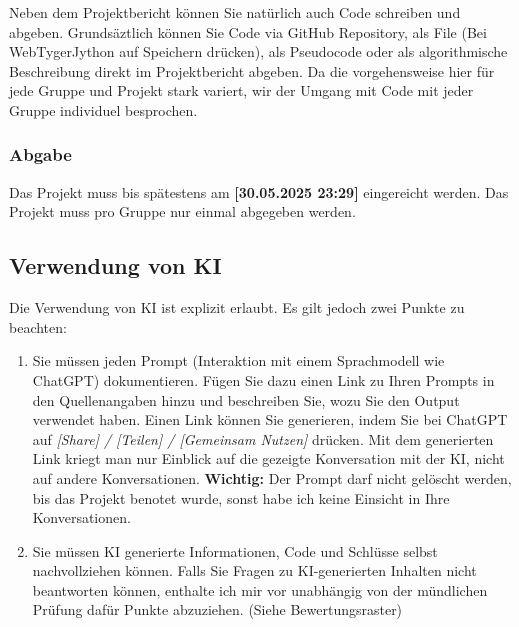 \documentclass[12pt, a4]{article}
\begin{document}
Neben dem Projektbericht können Sie natürlich auch Code schreiben und abgeben.
Grundsäztlich können Sie Code via GitHub Repository, als File (Bei WebTygerJython auf Speichern drücken), als Pseudocode oder als algorithmische Beschreibung direkt im Projektbericht abgeben.
Da die vorgehensweise hier für jede Gruppe und Projekt stark variert, wir der Umgang mit Code mit jeder Gruppe individuel besprochen.

\subsubsection*{Abgabe}
Das Projekt muss bis spätestens am \textbf{[30.05.2025 23:29]} eingereicht werden.
Das Projekt muss pro Gruppe nur einmal abgegeben werden.

\subsection*{Verwendung von KI}
Die Verwendung von KI ist explizit erlaubt. 
Es gilt jedoch zwei Punkte zu beachten: 

\begin{enumerate}
    \item Sie müssen jeden Prompt (Interaktion mit einem Sprachmodell wie ChatGPT) dokumentieren.
    Fügen Sie dazu einen Link zu Ihren Prompts in den Quellenangaben hinzu und beschreiben Sie, wozu Sie den Output verwendet haben.
    Einen Link können Sie generieren, indem Sie bei ChatGPT auf \textit{[Share] / [Teilen] / [Gemeinsam Nutzen]} drücken.
    Mit dem generierten Link kriegt man nur Einblick auf die gezeigte Konversation mit der KI, nicht auf andere Konversationen.
    \textbf{Wichtig:} Der Prompt darf nicht gelöscht werden, bis das Projekt benotet wurde, sonst habe ich keine Einsicht in Ihre Konversationen.
    \item Sie müssen KI generierte Informationen, Code und Schlüsse selbst nachvollziehen können.
    Falls Sie Fragen zu KI-generierten Inhalten nicht beantworten können, enthalte ich mir vor unabhängig von der mündlichen Prüfung dafür Punkte abzuziehen. (Siehe Bewertungsraster)
\end{enumerate}
\end{document}
